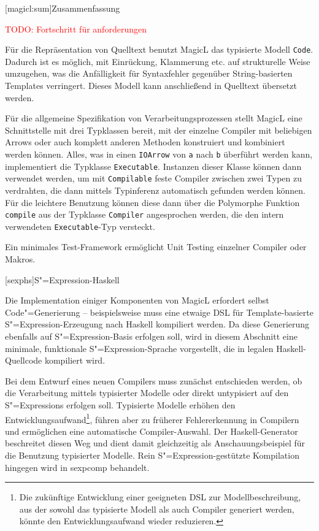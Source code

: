 \documentclass[11pt, a4paper, bibgerm]{scrbook}
\newcommand\icode[1]{\lstinline?#1?}
\newcommand{\todo}[1]{
  \textcolor{red}{TODO: #1}
}
\newcommand\lchapter{}
\newcommand\lsection{}
\newcommand\cref{}
\newcommand{\sexp}{S"=Expression}
\newcommand{\sexps}{S"=Expressions}
\newcommand{\cgen}{Code"=Generierung}
\begin{document}
\lsection[magicl:sum]{Zusammenfassung}

\todo{Fortschritt für anforderungen}

Für die Repräsentation von Quelltext benutzt MagicL das typisierte
Modell \icode{Code}. Dadurch ist es möglich, mit Einrückung, Klammerung
etc. auf strukturelle Weise umzugehen, was die Anfälligkeit für
Syntaxfehler gegenüber String-basierten Templates verringert. Dieses
Modell kann anschließend in Quelltext übersetzt werden.

Für die allgemeine Spezifikation von Verarbeitungsprozessen stellt
MagicL eine Schnittstelle mit drei Typklassen bereit, mit der einzelne
Compiler mit beliebigen Arrows oder auch komplett anderen Methoden
konstruiert und kombiniert werden können. Alles, was in einen
\icode{IOArrow} von \icode{a} nach \icode{b} überführt werden kann,
implementiert die Typklasse \icode{Executable}. Instanzen dieser Klasse
können dann verwendet werden, um mit \icode{Compilable} feste Compiler
zwischen zwei Typen zu verdrahten, die dann mittels Typinferenz
automatisch gefunden werden können. Für die leichtere Benutzung können
diese dann über die Polymorphe Funktion \icode{compile} aus der
Typklasse \icode{Compiler} angesprochen werden, die den intern
verwendeten \icode{Executable}-Typ versteckt.

Ein minimales Test-Framework ermöglicht Unit Testing einzelner Compiler
oder Makros.

\lchapter[sexphs]{\sexp{}-Haskell}

Die Implementation einiger Komponenten von MagicL erfordert selbst
\cgen{} -- beispielsweise muss eine etwaige DSL für Template-basierte
\sexp{}-Erzeugung nach Haskell kompiliert werden. Da diese Generierung
ebenfalls auf \sexp{}-Basis erfolgen soll, wird in diesem Abschnitt
eine minimale, funktionale \sexp{}-Sprache vorgestellt, die in legalen
Haskell-Quellcode kompiliert wird.

Bei dem Entwurf eines neuen Compilers muss zunächst entschieden
werden, ob die Verarbeitung mittels typisierter Modelle oder direkt
untypisiert auf den \sexps{} erfolgen soll. Typisierte Modelle erhöhen
den Entwicklungsaufwand\footnote{Die zukünftige Entwicklung einer
  geeigneten DSL zur Modellbeschreibung, aus der sowohl das typisierte
  Modell als auch Compiler generiert werden, könnte den
  Entwicklungsaufwand wieder reduzieren.}, führen aber zu früherer
Fehlererkennung in Compilern und ermöglichen eine automatische
Compiler-Auswahl. Der Haskell-Generator beschreitet diesen Weg und
dient damit gleichzeitig als Anschauungsbeispiel für die Benutzung
typisierter Modelle. Rein \sexp{}-gestützte Kompilation hingegen wird
in \cref{sexpcomp} behandelt.
\end{document}
